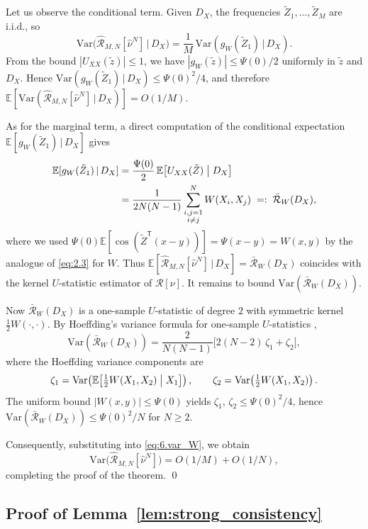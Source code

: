 \documentclass[11pt,leqno]{article}
\theoremstyle{plain}
\theoremstyle{remark}
\theoremstyle{definition}
\numberwithin{equation}{section}
\numberwithin{figure}{section}
\numberwithin{table}{section}
\numberwithin{algorithm}{section}
\newcommand{\EE}{\mathbb{E}}
\begin{document}
Let us observe the conditional term.
Given $D_X$, the frequencies $\tilde Z_1,\ldots,\tilde Z_M$ are i.i.d., so
\[
 \mathrm{Var}\bigl(\hat{\mathcal{R}}_{M,N}[\hat\nu^N]\,|\,D_X\bigr)
 = \frac{1}{M}\,\mathrm{Var}(g_W(\tilde Z_1)\,|\,D_X).
\]
From the bound $|U_{XX}(\tilde z)|\le 1$, we have $|g_W(\tilde z)|\le \Psi(0)/2$ uniformly in $\tilde z$ and $D_X$.
Hence $\mathrm{Var}(g_W(\tilde Z_1)\,|\,D_X)\le \Psi(0)^2/4$, and therefore
$\EE[\mathrm{Var}(\hat{\mathcal{R}}_{M,N}[\hat\nu^N]\,|\,D_X)] = O(1/M)$.

As for the marginal term,
a direct computation of the conditional expectation $\EE[g_W(\tilde Z_1)\,|\,D_X]$ gives
\begin{equation}\label{eq:6.tower_W}
\begin{aligned}
 \EE[g_W(\tilde Z_1)\,|\,D_X]
 &= \frac{\Psi(0)}{2}\,\EE\bigl[U_{XX}(\tilde Z)\bigm|D_X\bigr] \\
 &= \frac{1}{2N(N-1)}\sum_{\substack{i,j=1\\i\neq j}}^N W(X_i,X_j)
 \;=:\; \bar{\mathcal{R}}_W(D_X),
\end{aligned}
\end{equation}
where we used $\Psi(0)\EE[\cos(\tilde Z^{\mathsf{T}}(x-y))]=\Psi(x-y)=W(x,y)$
by the analogue of \eqref{eq:2.3} for $W$.
Thus $\EE[\hat{\mathcal{R}}_{M,N}[\hat\nu^N]\,|\,D_X]=\bar{\mathcal{R}}_W(D_X)$ coincides with the
kernel $U$-statistic estimator of $\mathcal{R}[\nu]$.
It remains to bound $\mathrm{Var}(\bar{\mathcal{R}}_W(D_X))$.

Now $\bar{\mathcal{R}}_W(D_X)$ is a one-sample $U$-statistic of degree $2$ with symmetric kernel $\tfrac{1}{2}W(\cdot,\cdot)$.
By Hoeffding's variance formula for one-sample $U$-statistics
\cite[Section~5.2]{ser:1980},
\[
 \mathrm{Var}(\bar{\mathcal{R}}_W(D_X))
 = \frac{2}{N(N-1)}\bigl[2(N-2)\,\zeta_1 + \zeta_2\bigr],
\]
where the Hoeffding variance components are
\[
 \zeta_1 = \mathrm{Var}\!\left(\EE\!\left[\tfrac{1}{2}W(X_1,X_2)\bigm|X_1\right]\right),\qquad
 \zeta_2 = \mathrm{Var}\!\left(\tfrac{1}{2}W(X_1,X_2)\right).
\]
The uniform bound $|W(x,y)|\le \Psi(0)$ yields $\zeta_1,\,\zeta_2\le \Psi(0)^2/4$,
hence $\mathrm{Var}(\bar{\mathcal{R}}_W(D_X))\le \Psi(0)^2/N$ for $N\ge 2$.

Consequently, substituting into \eqref{eq:6.var_W}, we obtain
\[
 \mathrm{Var}\bigl(\hat{\mathcal{R}}_{M,N}[\hat\nu^N]\bigr) = O(1/M) + O(1/N),
\]
completing the proof of the theorem.
\qed


\subsection{Proof of Lemma~\ref{lem:strong_consistency}}\label{sec:6.LemSC}
\end{document}
